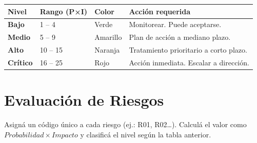 \documentclass[11pt,a4paper]{article}
\begin{document}
\begin{center}
\renewcommand{\arraystretch}{1.4}
\begin{tabularx}{\textwidth}{@{} p{3cm} p{2.5cm} p{3.5cm} X @{}}
\toprule
\textbf{Nivel} & \textbf{Rango (P×I)} & \textbf{Color} & \textbf{Acción requerida} \\
\midrule
\cellcolor{nivelbajo} \textbf{Bajo} & 1 -- 4 & Verde & Monitorear. Puede aceptarse. \\
\cellcolor{nivelmedio} \textbf{Medio} & 5 -- 9 & Amarillo & Plan de acción a mediano plazo. \\
\cellcolor{nivelalto} \textbf{Alto} & 10 -- 15 & Naranja & Tratamiento prioritario a corto plazo. \\
\cellcolor{nivelcritico} \textbf{Crítico} & 16 -- 25 & Rojo & Acción inmediata. Escalar a dirección. \\
\bottomrule
\end{tabularx}
\end{center}

\section{Evaluación de Riesgos}\label{sec:evaluacion}

Asigná un código único a cada riesgo (ej.: R01, R02\ldots). Calculá el valor como \(Probabilidad \times Impacto\) y clasificá el nivel según la tabla anterior.
\end{document}
